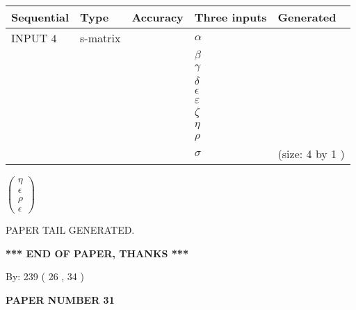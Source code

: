\documentclass[12pt]{article}
\begin{document}
  
\noindent\begin{tabular}{|l|l|l|l|l|}
\hline
 Sequential & Type & Accuracy & Three inputs & Generated \\ 
\hline
 
 
  INPUT $            4 $ & s-matrix & & 
 $  \alpha $ & 
  \\
  & & & 
 $  \beta $ & 
  \\
  & & & 
 $  \gamma $ & 
  \\
  & & & 
 $  \delta $ & 
  \\
  & & & 
 $  \epsilon $ & 
  \\
  & & & 
 $  \varepsilon $ & 
  \\
  & & & 
 $                     \zeta $ & 
  \\
  & & & 
 $  \eta $ & 
  \\
  & & & 
 $  \rho $ & 
  \\
  & & & 
 $  \sigma $ & 
  (size:            4  by            1 )
 \\  \hline  
 \end{tabular}
   
   
 $  \left( \begin{array}
 {
 c
 }
 \eta \\ 
 \epsilon \\ 
 \rho \\ 
 \epsilon
 \end{array} \right) $ 
   
   
   
   
 \vspace{0.2in}
 
   
   
\vspace{2.0in} PAPER TAIL GENERATED.
   
   
   
   
\vspace{1.0in} 
{\textbf{\large{ *** END OF PAPER, THANKS *** }}} 
   
   
\hspace{1.0in} By: 
         239 (          26 ,           34 )
   
   
   
   
\newpage 
\setcounter{page}{ 
    31001 } 
   
   
   
   
 {\textbf{ \Large{ PAPER NUMBER           31  }}}
   
   
\vspace{0.2in}
   
\end{document}
